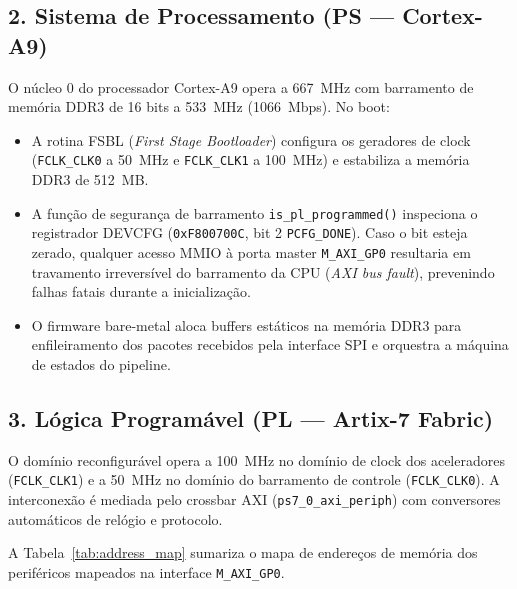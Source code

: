 \documentclass[11pt,a4paper]{article}
\begin{document}
\subsection{2. Sistema de Processamento (PS --- Cortex-A9)}
O núcleo 0 do processador Cortex-A9 opera a 667~MHz com barramento de memória DDR3 de 16 bits a 533~MHz (1066~Mbps). No boot:
\begin{itemize}
  \item A rotina FSBL (\textit{First Stage Bootloader}) configura os geradores de clock (\texttt{FCLK\_CLK0} a 50~MHz e \texttt{FCLK\_CLK1} a 100~MHz) e estabiliza a memória DDR3 de 512~MB.
  \item A função de segurança de barramento \texttt{is\_pl\_programmed()} inspeciona o registrador DEVCFG (\texttt{0xF800700C}, bit 2 \texttt{PCFG\_DONE}). Caso o bit esteja zerado, qualquer acesso MMIO à porta master \texttt{M\_AXI\_GP0} resultaria em travamento irreversível do barramento da CPU (\textit{AXI bus fault}), prevenindo falhas fatais durante a inicialização.
  \item O firmware bare-metal aloca buffers estáticos na memória DDR3 para enfileiramento dos pacotes recebidos pela interface SPI e orquestra a máquina de estados do pipeline.
\end{itemize}

\subsection{3. Lógica Programável (PL --- Artix-7 Fabric)}
O domínio reconfigurável opera a 100~MHz no domínio de clock dos aceleradores (\texttt{FCLK\_CLK1}) e a 50~MHz no domínio do barramento de controle (\texttt{FCLK\_CLK0}). A interconexão é mediada pelo crossbar AXI (\texttt{ps7\_0\_axi\_periph}) com conversores automáticos de relógio e protocolo.

A Tabela~\ref{tab:address_map} sumariza o mapa de endereços de memória dos periféricos mapeados na interface \texttt{M\_AXI\_GP0}.
\end{document}
